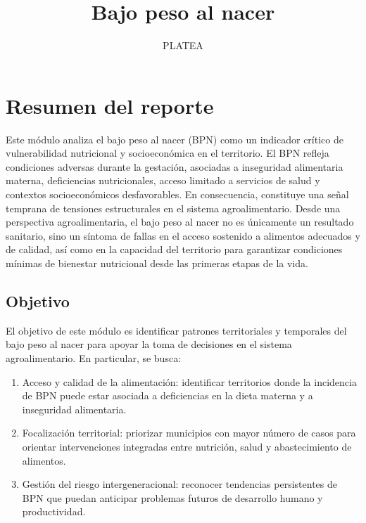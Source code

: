 \documentclass[
]{article}
\title{Bajo peso al nacer}
\subtitle{PLATEA}
\author{}
\date{\vspace{-2.5em}}
\begin{document}
\maketitle

{
\setcounter{tocdepth}{2}
\tableofcontents
}
\section{Resumen del reporte}\label{resumen-del-reporte}

Este módulo analiza el bajo peso al nacer (BPN) como un indicador
crítico de vulnerabilidad nutricional y socioeconómica en el territorio.
El BPN refleja condiciones adversas durante la gestación, asociadas a
inseguridad alimentaria materna, deficiencias nutricionales, acceso
limitado a servicios de salud y contextos socioeconómicos desfavorables.
En consecuencia, constituye una señal temprana de tensiones
estructurales en el sistema agroalimentario. Desde una perspectiva
agroalimentaria, el bajo peso al nacer no es únicamente un resultado
sanitario, sino un síntoma de fallas en el acceso sostenido a alimentos
adecuados y de calidad, así como en la capacidad del territorio para
garantizar condiciones mínimas de bienestar nutricional desde las
primeras etapas de la vida.

\subsection{Objetivo}\label{objetivo}

El objetivo de este módulo es identificar patrones territoriales y
temporales del bajo peso al nacer para apoyar la toma de decisiones en
el sistema agroalimentario. En particular, se busca:

\begin{enumerate}
\def\labelenumi{\arabic{enumi}.}
\item
  Acceso y calidad de la alimentación: identificar territorios donde la
  incidencia de BPN puede estar asociada a deficiencias en la dieta
  materna y a inseguridad alimentaria.
\item
  Focalización territorial: priorizar municipios con mayor número de
  casos para orientar intervenciones integradas entre nutrición, salud y
  abastecimiento de alimentos.
\item
  Gestión del riesgo intergeneracional: reconocer tendencias
  persistentes de BPN que puedan anticipar problemas futuros de
  desarrollo humano y productividad.
\end{enumerate}
\end{document}
